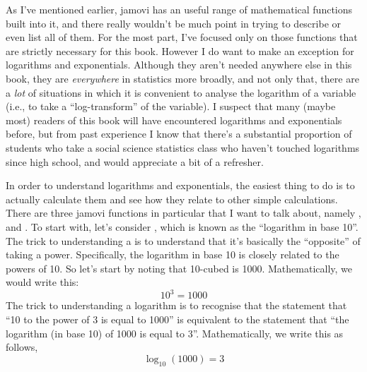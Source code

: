 

As I've mentioned earlier, jamovi has an useful range of mathematical functions built into it, and there really wouldn't be much point in trying to describe or even list all of them. For the most part, I've focused only on those functions that are strictly necessary for this book. However I do want to make an exception for logarithms and exponentials. Although they aren't needed anywhere else in this book, they are {\it everywhere} in statistics more broadly, and not only that, there are a {\it lot} of situations in which it is convenient to analyse the logarithm of a variable (i.e., to take a ``log-transform'' of the variable). I suspect that many (maybe most) readers of this book will have encountered logarithms and exponentials before, but from past experience I know that there's a substantial proportion of students who take a social science statistics class who haven't touched logarithms since high school, and would appreciate a bit of a refresher. 

In order to understand logarithms and exponentials, the easiest thing to do is to actually calculate them and see how they relate to other simple calculations. There are three jamovi functions in particular that I want to talk about, namely ,  and . To start with, let's consider , which is known as the ``logarithm in base 10''. The trick to understanding a  is to understand that it's basically the ``opposite'' of taking a power. Specifically, the logarithm in base 10 is closely related to the powers of 10. So let's start by noting that 10-cubed is 1000. Mathematically, we would write this:
$$ 
10^3 = 1000
$$
The trick to understanding a logarithm is to recognise that the statement that ``10 to the power of 3 is equal to 1000'' is equivalent to the statement that ``the logarithm (in base 10) of 1000 is equal to 3''. Mathematically, we write this as follows,
$$
\log_{10}( 1000 ) = 3
$$

